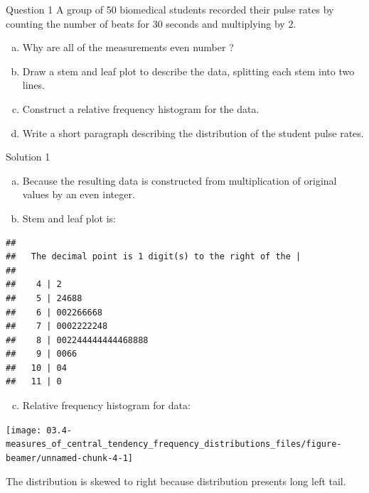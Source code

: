 \documentclass[
  ignorenonframetext,
  aspectratio=169]{beamer}
\providecommand{\tightlist}{%
  \setlength{\itemsep}{0pt}\setlength{\parskip}{0pt}}
\begin{document}
\begin{frame}{Question 1}
\protect\hypertarget{question-1}{}
A group of 50 biomedical students recorded their pulse rates by counting
the number of beats for 30 seconds and multiplying by 2.

\begin{enumerate}
[a.]
\tightlist
\item
  Why are all of the measurements even number ?
\item
  Draw a stem and leaf plot to describe the data, splitting each stem
  into two lines.
\item
  Construct a relative frequency histogram for the data.
\item
  Write a short paragraph describing the distribution of the student
  pulse rates.
\end{enumerate}
\end{frame}

\begin{frame}[fragile]{Solution 1}
\protect\hypertarget{solution-1}{}
\begin{enumerate}
[a.]
\item
  Because the resulting data is constructed from multiplication of
  original values by an even integer.
\item
  Stem and leaf plot is:
\end{enumerate}

\begin{verbatim}
## 
##   The decimal point is 1 digit(s) to the right of the |
## 
##    4 | 2
##    5 | 24688
##    6 | 002266668
##    7 | 0002222248
##    8 | 002244444444468888
##    9 | 0066
##   10 | 04
##   11 | 0
\end{verbatim}

\begin{enumerate}
[a.]
\setcounter{enumi}{2}
\tightlist
\item
  Relative frequency histogram for data:
\end{enumerate}

\texttt{[image: 03.4-measures\_of\_central\_tendency\_frequency\_distributions\_files/figure-beamer/unnamed-chunk-4-1]}

The distribution is skewed to right because distribution presents long
left tail.
\end{frame}
\end{document}
